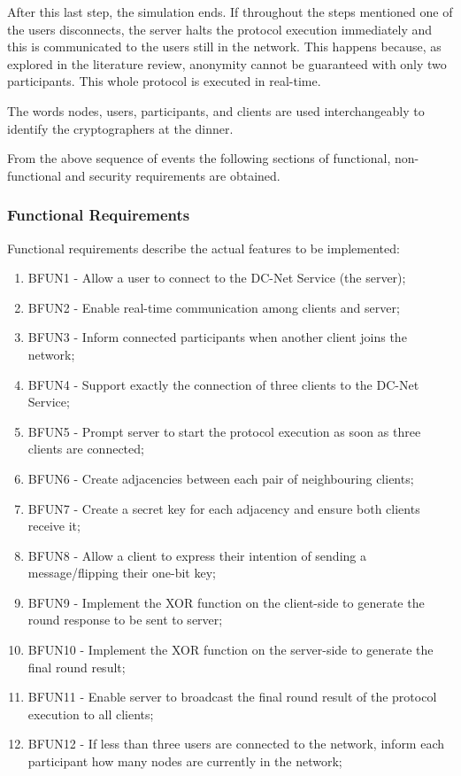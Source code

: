 After this last step, the simulation ends. If throughout the steps mentioned one of the users disconnects, the server halts the protocol execution immediately and this is communicated to the users still in the network. This happens because, as explored in the literature review, anonymity cannot be guaranteed with only two participants. This whole protocol is executed in real-time.

The words nodes, users, participants, and clients are used interchangeably to identify the cryptographers at the dinner.

From the above sequence of events the following sections of functional, non-functional and security requirements are obtained.

\subsubsection{Functional Requirements}
Functional requirements describe the actual features to be implemented:
\begin{enumerate}
    \item BFUN1 - Allow a user to connect to the DC-Net Service (the server);
    \item BFUN2 - Enable real-time communication among clients and server;
    \item BFUN3 - Inform connected participants when another client joins the network;
    \item BFUN4 - Support exactly the connection of three clients to the DC-Net Service;
    \item BFUN5 - Prompt server to start the protocol execution as soon as three clients are connected;
    \item BFUN6 - Create adjacencies between each pair of neighbouring clients;
    \item BFUN7 - Create a secret key for each adjacency and ensure both clients receive it;
    \item BFUN8 - Allow a client to express their intention of sending a message/flipping their one-bit key;
    \item BFUN9 - Implement the XOR function on the client-side to generate the round response to be sent to server;
    \item BFUN10 - Implement the XOR function on the server-side to generate the final round result;
    \item BFUN11 - Enable server to broadcast the final round result of the protocol execution to all clients;
    \item BFUN12 - If less than three users are connected to the network, inform each participant how many nodes are currently in the network;
\end{enumerate}

